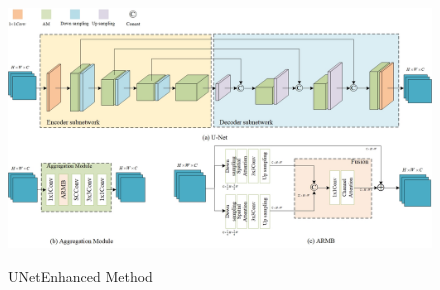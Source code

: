 \documentclass[CJK,aspectratio=169]{beamer}  %
\begin{document}
\begin{frame}
		\begin{figure}
			\centering
			\begin{minipage}{.65\textwidth}
				\includegraphics[width=0.85\linewidth]{picture/LLIE/My Architecture/U-Net and AM.jpg}
				\captionsetup{font=scriptsize}
				\label{fig: U-Net and AM}	
				\caption*{UNetEnhanced Method}
			\end{minipage}
			\captionsetup{font=scriptsize}
			\caption{
				\label{fig: CNN Branch}
			}
		\end{figure}
		
	\end{frame}
	
%		
%		
%		
	
\end{document}
